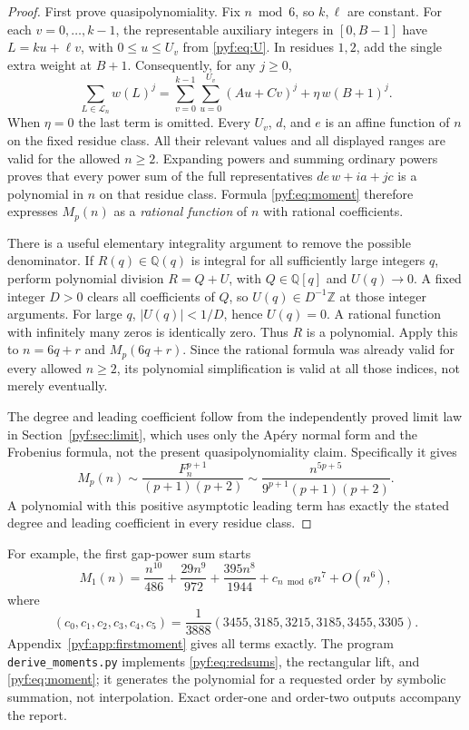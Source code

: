 \documentclass[11pt,a4paper]{article}
\numberwithin{equation}{section}
\theoremstyle{definition}
\newcommand{\Z}{\mathbb Z}
\newcommand{\Q}{\mathbb Q}
\begin{document}
\begin{proof}
First prove quasipolynomiality. Fix $n\bmod6$, so $k,\ell$ are constant.
For each $v=0,\ldots,k-1$, the representable auxiliary integers in
$[0,B-1]$ have $L=ku+\ell v$, with $0\leq u\leq U_v$ from
\eqref{pyf:eq:U}. In residues $1,2$, add the single extra weight at $B+1$.
Consequently, for any $j\geq0$,
\begin{equation}\label{pyf:eq:redsums}
\sum_{L\in\mathcal L_n}w(L)^j
=\sum_{v=0}^{k-1}\sum_{u=0}^{U_v}(Au+Cv)^j
 +\eta\,w(B+1)^j.
\end{equation}
When $\eta=0$ the last term is omitted. Every $U_v$, $d$, and $e$ is an
affine function of $n$ on the fixed residue class. All their relevant
values and all displayed ranges are valid for the allowed $n\geq2$.
Expanding powers and summing ordinary powers proves that every power sum
of the full representatives $de\,w+ia+jc$ is a polynomial in $n$ on that
residue class. Formula \eqref{pyf:eq:moment} therefore expresses $M_p(n)$ as a
\emph{rational function} of $n$ with rational coefficients.

There is a useful elementary integrality argument to remove the possible
denominator. If $R(q)\in\Q(q)$ is integral for all sufficiently large
integers $q$, perform polynomial division $R=Q+U$, with
$Q\in\Q[q]$ and $U(q)\to0$. A fixed integer $D>0$ clears all coefficients
of $Q$, so $U(q)\in D^{-1}\Z$ at those integer arguments. For large $q$,
$|U(q)|<1/D$, hence $U(q)=0$. A rational function with infinitely many
zeros is identically zero. Thus $R$ is a polynomial. Apply this to
$n=6q+r$ and $M_p(6q+r)$. Since the rational formula was already valid
for every allowed $n\geq2$, its polynomial simplification is valid at
all those indices, not merely eventually.

The degree and leading coefficient follow from the independently proved
limit law in Section~\ref{pyf:sec:limit}, which uses only the Ap\'ery normal
form and the Frobenius formula, not the present quasipolynomiality claim.
Specifically it gives
\[
M_p(n)\sim\frac{F_n^{p+1}}{(p+1)(p+2)}
\sim\frac{n^{5p+5}}{9^{p+1}(p+1)(p+2)}.
\]
A polynomial with this positive asymptotic leading term has exactly the
stated degree and leading coefficient in every residue class.
\end{proof}

For example, the first gap-power sum starts
\begin{equation}\label{pyf:eq:firstmomexp}
M_1(n)=\frac{n^{10}}{486}+\frac{29n^9}{972}
       +\frac{395n^8}{1944}+c_{n\bmod6}n^7+O(n^6),
\end{equation}
where
\[
(c_0,c_1,c_2,c_3,c_4,c_5)
=\frac1{3888}(3455,3185,3215,3185,3455,3305).
\]
Appendix~\ref{pyf:app:firstmoment} gives all terms exactly.
The program \texttt{derive\_moments.py} implements \eqref{pyf:eq:redsums}, the
rectangular lift, and \eqref{pyf:eq:moment}; it generates the polynomial
for a requested order by symbolic summation, not interpolation. Exact
order-one and order-two outputs accompany the report.
\end{document}
